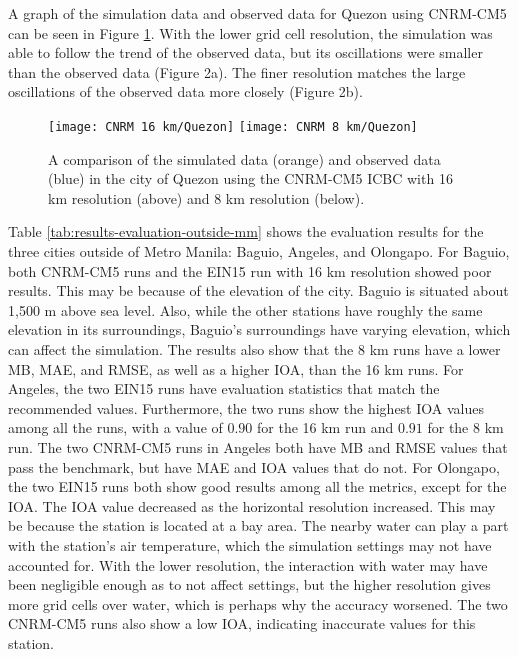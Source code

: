 		A graph of the simulation data and observed data for Quezon using CNRM-CM5 can be seen in Figure \ref{fig:cnrm-sim-vs-observed-quezon}. 
		With the lower grid cell resolution, the simulation was able to follow the trend of the observed data, but its oscillations were smaller than the observed data (Figure 2a).
		The finer resolution matches the large oscillations of the observed data more closely (Figure 2b).
		
		\begin{figure}	
			\centering
			\texttt{[image: CNRM 16 km/Quezon]}
			\texttt{[image: CNRM 8 km/Quezon]}
			\caption{
				A comparison of the simulated data (orange) and observed data (blue) in the city of Quezon using the CNRM-CM5 ICBC with 16 km resolution (above) and 8 km resolution (below).
			}
			\label{fig:cnrm-sim-vs-observed-quezon}
		\end{figure}
		
		Table \ref{tab:results-evaluation-outside-mm} shows the evaluation results for the three cities outside of Metro Manila: Baguio, Angeles, and Olongapo.
		For Baguio, both CNRM-CM5 runs and the EIN15 run with 16 km resolution showed poor results.
		This may be because of the elevation of the city.
		Baguio is situated about 1,500 m above sea level.
		Also, while the other stations have roughly the same elevation in its surroundings, Baguio’s surroundings have varying elevation, which can affect the simulation.
		The results also show that the 8 km runs have a lower MB, MAE, and RMSE, as well as a higher IOA, than the 16 km runs.
		For Angeles, the two EIN15 runs have evaluation statistics that match the recommended values.
		Furthermore, the two runs show the highest IOA values among all the runs, with a value of $0.90$ for the 16 km run and $0.91$ for the 8 km run.
		The two CNRM-CM5 runs in Angeles both have MB and RMSE values that pass the benchmark, but have MAE and IOA values that do not.
		For Olongapo, the two EIN15 runs both show good results among all the metrics, except for the IOA.
		The IOA value decreased as the horizontal resolution increased. This may be because the station is located at a bay area. 
		The nearby water can play a part with the station’s air temperature, which the simulation settings may not have accounted for.
		With the lower resolution, the interaction with water may have been negligible enough as to not affect settings, but the higher resolution gives more grid cells over water, which is perhaps why the accuracy worsened.
		The two CNRM-CM5 runs also show a low IOA, indicating inaccurate values for this station.
	
